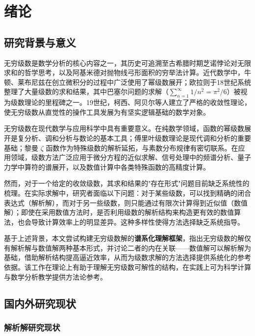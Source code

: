 
\chapter{绪论}

\section{研究背景与意义}

无穷级数是数学分析的核心内容之一，其历史可追溯至古希腊时期芝诺悖论对无限求和的哲学思考，以及阿基米德对抛物线弓形面积的穷举法计算。近代数学中，牛顿、莱布尼兹在创立微积分的过程中广泛使用了幂级数展开；欧拉则于18世纪系统整理了大量级数的求和结果，其中巴塞尔问题的求解（$\displaystyle \sum_{n=1}^{\infty}1/n^2=\pi^2/6$）被视为级数理论的里程碑之一。19世纪，柯西、阿贝尔等人建立了严格的收敛性理论，使无穷级数从直觉性的操作工具发展为有坚实逻辑基础的数学对象。

无穷级数在现代数学与应用科学中具有重要意义。在纯数学领域，函数的幂级数展开是复分析、调和分析与数论的基本工具；傅里叶级数理论是现代调和分析的重要基础；黎曼 $\zeta$ 函数作为特殊级数的解析延拓，与素数分布规律有密切联系。在应用领域，级数方法广泛应用于微分方程的近似求解、信号处理中的频谱分析、量子力学中算符的谱展开，以及数值计算中各类特殊函数的高精度计算。

然而，对于一个给定的收敛级数，其求和结果的"存在形式"问题目前缺乏系统性的梳理。在实际求解中，研究者面临以下问题：对于某些级数，可以找到精确的闭合表达式（解析解），而对于另一些级数，则只能通过有限次计算得到近似值（数值解）；即使在采用数值方法时，是否利用级数的解析结构来构造更有效的数值算法，也会导致计算效率上的明显差异。这种多样性使得方法选择缺乏系统指导。

基于上述背景，本文尝试构建无穷级数解的\textbf{谱系化理解框架}，指出无穷级数的解仅有解析解与数值解两种基本形式，并讨论二者的内在关联——数值解可以解析解为基础，借助解析结构提高逼近效率，从而为级数求解的方法选择提供系统化的参考依据。该工作在理论上有助于理解无穷级数可解性的结构，在实践上可为科学计算与数学分析教学提供方法论参考。

\section{国内外研究现状}

\subsection{解析解研究现状}

